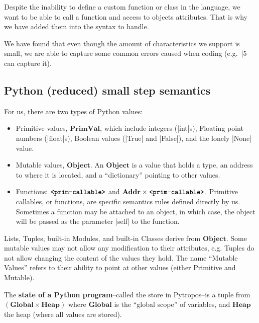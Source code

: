 Despite the inability to define a custom function or class in the language, we
want to be able to call a function and access to objects attributes. That is why we have
added them into the syntax to handle.

We have found that even though the amount of characteristics we support is small, we are
able to capture some common errors caused when coding (e.g.~\pycode|5 %
can capture it).

\subsection{Python (reduced) small step semantics}\label{reducedsyntaxapp}

For us, there are two types of Python values:

\begin{itemize}
\tightlist
\item Primitive values, \(\mathbf{PrimVal}\), which include integers (\pycode|int|s),
  Floating point numbers (\pycode|float|s), Boolean values (\pycode|True| and
  \pycode|False|), and the lonely \pycode|None| value.
\item Mutable values, \(\mathbf{Object}\). An \(\mathbf{Object}\) is a value that holds a
  type, an address to where it is located, and a \enquote{dictionary} pointing to other
  values.
\item Functions: \(\textbf{\texttt{<prim-callable>}}\) and
  \(\mathbf{Addr} \times \textbf{\texttt{<prim-callable>}}\). Primitive callables, or
  functions, are specific semantics rules defined directly by us. Sometimes a function may
  be attached to an object, in which case, the object will be passed as the parameter
  \pycode|self| to the function.
\end{itemize}

Lists, Tuples, built-in Modules, and built-in Classes derive from \(\mathbf{Object}\).
Some mutable values may not allow any modification to their attributes, e.g.  Tuples do
not allow changing the content of the values they hold. The name \enquote{Mutable Values}
refers to their ability to point at other values (either Primitive and Mutable).

The \textbf{state of a Python program}--called the store in Pytropos--is a tuple
from \(\left(\mathbf{Global} \times \mathbf{Heap}\right)\) where \(\mathbf{Global}\) is
the \enquote{global scope} of variables, and \(\mathbf{Heap}\) the heap (where all values
are stored).

